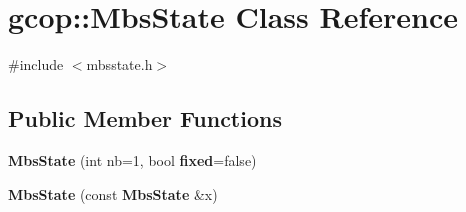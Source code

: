 \section{gcop\-:\-:\-Mbs\-State \-Class \-Reference}
\label{classgcop_1_1MbsState}


{\ttfamily \#include $<$mbsstate.\-h$>$}

\subsection*{\-Public \-Member \-Functions}
\begin{DoxyCompactItemize}
\item 
{\bf \-Mbs\-State} (int nb=1, bool {\bf fixed}=false)
\item 
{\bf \-Mbs\-State} (const {\bf \-Mbs\-State} \&x)
\end{DoxyCompactItemize}
